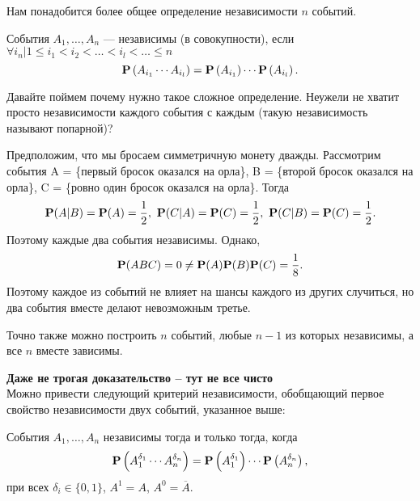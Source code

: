\documentclass[11 pt,russian]{article}
\begin{document}
Нам понадобится более общее определение независимости $n$ событий.
\begin{Def}
События $A_1,\dotsc,A_n$ --- независимы (в совокупности), если $\forall {i_n | 1\leq i_1 < i_2 < \dots < i_l < \dots \leq n}$ 
$${\bf P}\left(A_{i_1} \dotsm A_{i_l}\right) = {\bf P}\left(A_{i_1}\right) \dotsm {\bf P}\left(A_{i_l}\right).
$$
\end{Def}
Давайте поймем почему нужно такое сложное определение. Неужели не хватит просто независимости каждого события с каждым (такую независимость называют попарной)?
\begin{Exam}
Предположим, что мы бросаем симметричную монету дважды. Рассмотрим события A = \{первый бросок оказался на орла\}, B = \{второй бросок оказался на орла\}, C = \{ровно один бросок оказался на орла\}. Тогда 
$$
{\bf P}(A|B) = {\bf P}(A) = \frac12,\ 
{\bf P}(C|A) = {\bf P}(C) = \frac12,\
{\bf P}(C|B) = {\bf P}(C) = \frac12.
$$
Поэтому каждые два события независимы. Однако,
$$
{\bf P}(ABC) = 0 \neq {\bf P}(A) {\bf P}(B) {\bf P}(C) = \frac18.
$$
Поэтому каждое из событий не влияет на шансы каждого из других случиться, но два события вместе делают невозможным третье.

Точно также можно построить $n$ событий, любые $n-1$ из которых независимы, а все $n$ вместе зависимы.
\end{Exam}
{\bf Даже не трогая доказательство -- тут не все чисто\\ }
Можно привести следующий критерий независимости, обобщающий первое свойство независимости двух событий, указанное выше:
\begin{Lemm}
\label{LemmDelt}
События $A_1,\dotsc,A_n$ независимы тогда и только тогда, когда 
\begin{equation}
\label{L2-Th2}
{\bf P}\left(A_1^{\delta_1} \dotsm A_n^{\delta_n}\right) = {\bf P}\left(A_1^{\delta_1}\right) \dotsm {\bf P}\left(A_n^{\delta_n}\right),
\end{equation}
при всех $\delta_i\in \{0,1\}$, $A^{1}=A$, $A^0=\overline{A}$.
\end{Lemm}
\end{document}
